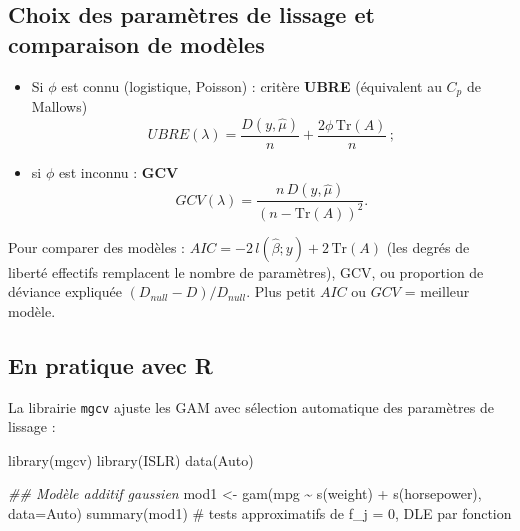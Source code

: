 \documentclass[
  french,
  letterpaper,
  DIV=11,
  numbers=noendperiod]{scrreprt}
\newenvironment{Shaded}{\begin{snugshade}}{\end{snugshade}}
\newcommand{\AttributeTok}[1]{\textcolor[rgb]{0.40,0.45,0.13}{#1}}
\newcommand{\CommentTok}[1]{\textcolor[rgb]{0.37,0.37,0.37}{#1}}
\newcommand{\DocumentationTok}[1]{\textcolor[rgb]{0.37,0.37,0.37}{\textit{#1}}}
\newcommand{\FunctionTok}[1]{\textcolor[rgb]{0.28,0.35,0.67}{#1}}
\newcommand{\NormalTok}[1]{\textcolor[rgb]{0.00,0.23,0.31}{#1}}
\newcommand{\OtherTok}[1]{\textcolor[rgb]{0.00,0.23,0.31}{#1}}
\newcommand{\SpecialCharTok}[1]{\textcolor[rgb]{0.37,0.37,0.37}{#1}}
\begin{document}
\subsection{Choix des paramètres de lissage et comparaison de
modèles}\label{choix-des-paramuxe8tres-de-lissage-et-comparaison-de-moduxe8les}

\begin{itemize}
\item
  Si \(\phi\) est connu (logistique, Poisson) : critère \textbf{UBRE}
  (équivalent au \(C_p\) de Mallows)
  \[UBRE(\lambda) = \frac{D(y,\hat\mu)}{n} + \frac{2\phi\,\mathrm{Tr}(A)}{n}\,;\]
\item
  si \(\phi\) est inconnu : \textbf{GCV}
  \[GCV(\lambda) = \frac{n\,D(y,\hat\mu)}{\left(n - \mathrm{Tr}(A)\right)^2}.\]
\end{itemize}

Pour comparer des modèles :
\(AIC = -2\,l(\hat\beta;y) + 2\,\mathrm{Tr}(A)\) (les degrés de liberté
effectifs remplacent le nombre de paramètres), GCV, ou proportion de
déviance expliquée \((D_{null} - D)/D_{null}\). Plus petit \(AIC\) ou
\(GCV\) = meilleur modèle.

\subsection{En pratique avec R}\label{en-pratique-avec-r}

La librairie \texttt{mgcv} ajuste les GAM avec sélection automatique des
paramètres de lissage :

\begin{Shaded}
\begin{Highlighting}[]
\FunctionTok{library}\NormalTok{(mgcv)}
\FunctionTok{library}\NormalTok{(ISLR)}
\FunctionTok{data}\NormalTok{(Auto)}

\DocumentationTok{\#\# Modèle additif gaussien}
\NormalTok{mod1 }\OtherTok{\textless{}{-}} \FunctionTok{gam}\NormalTok{(mpg }\SpecialCharTok{\textasciitilde{}} \FunctionTok{s}\NormalTok{(weight) }\SpecialCharTok{+} \FunctionTok{s}\NormalTok{(horsepower), }\AttributeTok{data=}\NormalTok{Auto)}
\FunctionTok{summary}\NormalTok{(mod1)   }\CommentTok{\# tests approximatifs de f\_j = 0, DLE par fonction}
\end{Highlighting}
\end{Shaded}
\end{document}
